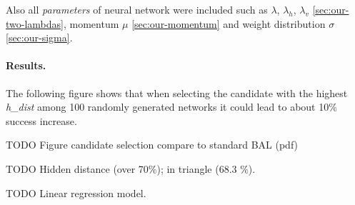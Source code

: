 Also all \emph{parameters} of neural network were included such as $\lambda$, $\lambda_h$, $\lambda_v$ \ref{sec:our-two-lambdas}, momentum $\mu$ \ref{sec:our-momentum} and weight distribution $\sigma$ \ref{sec:our-sigma}. 


\paragraph{Results.} 
The following figure shows that when selecting the candidate with the highest \emph{h\_dist} among 100 randomly generated networks it could lead to about 10\% success increase. 

TODO Figure candidate selection compare to standard BAL (pdf) 

TODO Hidden distance (over 70\%); in triangle (68.3 \%). 

TODO Linear regression model. 
